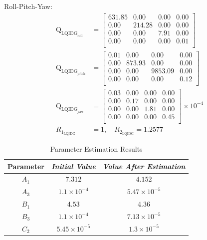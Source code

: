 \documentclass[conference]{IEEEtran}
\begin{document}
Roll-Pitch-Yaw:
\begin{equation}
	\begin{split}
		\boldsymbol{\mathrm{Q}}_{{\text{LQIDG}_{\text{roll}}}} &= \begin{bmatrix}
			631.85 & 0.00 & 0.00 & 0.00  \\ 
			0.00 & 214.28 & 0.00 & 0.00  \\ 
			0.00 & 0.00 & 7.91 & 0.00  \\ 
			0.00 & 0.00 & 0.00 & 0.01  \\ 
		\end{bmatrix} \\[1em]
		\boldsymbol{\mathrm{Q}}_{{\text{LQIDG}_{\text{pitch}}}} &= \begin{bmatrix}
			0.01 & 0.00 & 0.00 & 0.00  \\
			0.00 & 873.93 & 0.00 & 0.00  \\ 
			0.00 & 0.00 & 9853.09 & 0.00 \\ 
			0.00 & 0.00 & 0.00 & 0.12  \\ 
		\end{bmatrix}\\[1em]
		\boldsymbol{\mathrm{Q}}_{{\text{LQIDG}_{\text{yaw}}}}  &= \begin{bmatrix}
			0.03 & 0.00 & 0.00 & 0.00 \\ 
			0.00 & 0.17 & 0.00 & 0.00 \\ 
			0.00 & 0.00 & 1.81 & 0.00 \\ 
			0.00 & 0.00 & 0.00 & 0.45 \\
		\end{bmatrix}\times 10^{-4}\\[1em]
          R_{1_{\text{LQIDG}}} &= 1, \quad  R_{2_{\text{LQIDG}}} = 1.2577
	\end{split}
\end{equation}

\begin{table}[htbp]
	\renewcommand{\arraystretch}{1.3}
	\caption{Parameter Estimation Results}
	\begin{center}
	\begin{tabular}{c c c}
	\hline
	\textbf{Parameter} & \textbf{\textit{Initial Value}}& \textbf{\textit{Value After Estimation}} \\
	\hline
	$A_1$ & $7.312$ & $4.152$ \\
	$A_3$  & $1.1\times10^{-4}$ & $5.47\times10^{-5}$\\
	$B_1$  & $4.53$ & $4.36$ \\
	$B_3$  & $1.1\times10^{-4}$ & $7.13\times10^{-5}$ \\ 
	$C_2$  & $5.45\times10^{-5}$ & $1.3\times10^{-5}$ \\
	\hline
	\end{tabular}
	\label{tab1}
	\end{center}
	\end{table}
\end{document}
